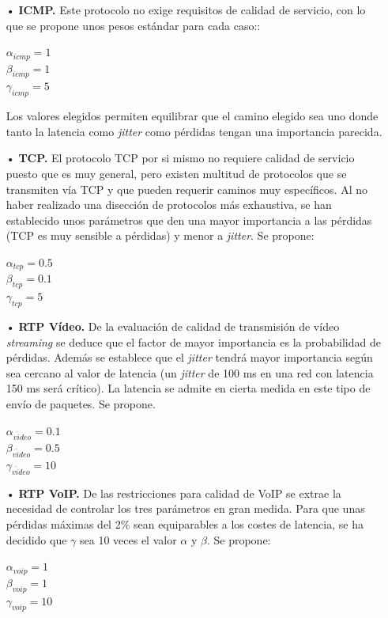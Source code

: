 \documentclass[a4paper,11pt]{book}
\begin{document}
\begin{itemize}
\item[•] \textbf{\ac{ICMP}.} Este protocolo no exige requisitos de calidad de servicio, con lo que se propone unos pesos estándar para cada caso::

\begin{center}
$\alpha_{icmp} = 1$ \\ $\beta_{icmp} = 1$ \\ $\gamma_{icmp} = 5$
\end{center}

Los valores elegidos permiten equilibrar que el camino elegido sea uno donde tanto la latencia como \textit{jitter} como pérdidas tengan una importancia parecida.

\item[•] \textbf{\ac{TCP}.} El protocolo \ac{TCP} por si mismo no requiere calidad de servicio puesto que es muy general, pero existen multitud de protocolos que se transmiten vía \ac{TCP} y que pueden requerir caminos muy específicos. Al no haber realizado una disección de protocolos más exhaustiva, se han establecido unos parámetros que den una mayor importancia a las pérdidas (\ac{TCP} es muy sensible a pérdidas) y menor a \textit{jitter}. Se propone:

\begin{center}
$\alpha_{tcp} = 0.5$ 	\\ $\beta_{tcp} = 0.1$ \\ $\gamma_{tcp} = 5$
\end{center}


\item[•] \textbf{\ac{RTP} Vídeo.} De la evaluación de calidad de transmisión de vídeo \textit{streaming} se deduce que el factor de mayor importancia es la probabilidad de pérdidas. Además se establece que el \textit{jitter} tendrá mayor importancia según sea cercano al valor de latencia (un \textit{jitter} de 100 ms en una red con latencia 150 ms será crítico). La latencia se admite en cierta medida en este tipo de envío de paquetes. Se propone.

\begin{center}
$\alpha_{v\acute{i}deo} = 0.1$ \\ $\beta_{v\acute{i}deo} = 0.5$ \\ $\gamma_{v\acute{i}deo} = 10$
\end{center}

\item[•] \textbf{\ac{RTP} VoIP.} De las restricciones para calidad de \ac{VoIP} se extrae la necesidad de controlar los tres parámetros en gran medida. Para que unas pérdidas máximas del 2\% sean equiparables a los costes de latencia, se ha decidido que $\gamma$ sea 10 veces el valor $\alpha$ y $\beta$. Se propone:

\begin{center}
$\alpha_{voip} = 1$ \\ $\beta_{voip} = 1$ \\ $\gamma_{voip} = 10$
\end{center}

\end{itemize}
\end{document}

